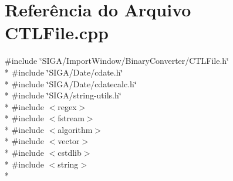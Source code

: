 \section{Referência do Arquivo C\+T\+L\+File.\+cpp}
\label{_c_t_l_file_8cpp}
{\ttfamily \#include \char`\"{}S\+I\+G\+A/\+Import\+Window/\+Binary\+Converter/\+C\+T\+L\+File.\+h\char`\"{}}\\*
{\ttfamily \#include \char`\"{}S\+I\+G\+A/\+Date/cdate.\+h\char`\"{}}\\*
{\ttfamily \#include \char`\"{}S\+I\+G\+A/\+Date/cdatecalc.\+h\char`\"{}}\\*
{\ttfamily \#include \char`\"{}S\+I\+G\+A/string-\/utils.\+h\char`\"{}}\\*
{\ttfamily \#include $<$regex$>$}\\*
{\ttfamily \#include $<$fstream$>$}\\*
{\ttfamily \#include $<$algorithm$>$}\\*
{\ttfamily \#include $<$vector$>$}\\*
{\ttfamily \#include $<$cstdlib$>$}\\*
{\ttfamily \#include $<$string$>$}\\*
